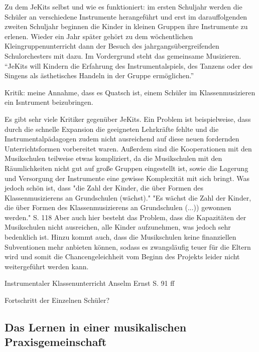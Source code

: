 Zu dem JeKits selbst und wie es funktioniert: im ersten Schuljahr werden die
Schüler an verschiedene Instrumente herangeführt und erst im darauffolgenden
zweiten Schuljahr beginnen die Kinder in kleinen Gruppen ihre Instrumente zu
erlenen. Wieder ein Jahr später gehört zu dem wöchentlichen
Kleingruppenunterricht dann der Besuch des jahrgangsübergreifenden
Schulorchesters mit dazu. Im Vordergrund steht das gemeinsame Musizieren.
\enquote{JeKits will Kindern die Erfahrung des Instrumentalspiels, des Tanzens
oder des Singens als ästhetisches Handeln in der Gruppe ermöglichen.}



Kritik: meine Annahme, dass es Quatsch ist, einem Schüler im Klassenmusizieren
ein Isntrument beizubringen.

Es gibt sehr viele Kritiker gegenüber JeKits. Ein Problem ist beispielweise,
dass durch die schnelle Expansion die geeigneten Lehrkräfte fehlte und die
Instrumentalpädagogen zudem nicht ausreichend auf diese neuen fordernden
Unterrichtsformen vorbereitet waren. Außerdem sind die Kooperationen mit den
Musikschulen teilweise etwas kompliziert, da die Musikschulen mit den
Räumlichkeiten nicht gut auf große Gruppen eingestellt ist, sowie die Lagerung
und Versorgung der Instrumente eine gewisse Komplexität mit sich bringt. Was
jedoch schön ist, dass "die Zahl der Kinder, die über Formen des
Klassenmusizierens an Grundschulen (wächst)." "Es wächst die Zahl der Kinder,
die über Formen des Klassenmusizierens an Grundschulen (...)) gewonnen werden."
S. 118 Aber auch hier besteht das Problem, dass die Kapazitäten der Musikschulen
nicht ausreichen, alle Kinder aufzunehmen, was jedoch sehr bedenklich ist. Hinzu
kommt auch, dass die Musikschulen keine finanziellen Subventionen mehr anbieten
können, sodass es zwangsläufig teuer für die Eltern wird und somit die
Chancengeleichheit vom Beginn des Projekts leider nicht weitergeführt werden
kann.

Instrumentaler Klassenunterricht Anselm Ernst S. 91 ff

Fortschritt der Einzelnen Schüler?



\subsection{Das Lernen in einer musikalischen Praxisgemeinschaft}
